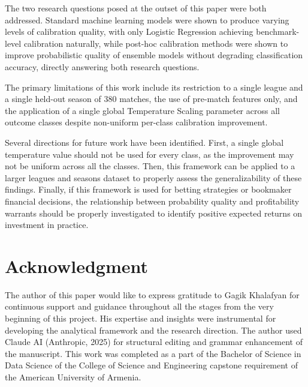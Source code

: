 \documentclass[conference]{IEEEtran}
\begin{document}
The two research questions posed at the outset of this paper
were both addressed. Standard machine learning models were
shown to produce varying levels of calibration quality, with
only Logistic Regression achieving benchmark-level
calibration naturally, while post-hoc calibration methods
were shown to improve probabilistic quality of ensemble
models without degrading classification accuracy, directly
answering both research questions.

The primary limitations of this work include its restriction
to a single league and a single held-out season of 380
matches, the use of pre-match features only, and the
application of a single global Temperature Scaling parameter
across all outcome classes despite non-uniform per-class
calibration improvement.

Several directions for future work have been identified.
First, a single global temperature value should not be used
for every class, as the improvement may not be uniform
across all the classes. Then, this framework can be applied
to a larger leagues and seasons dataset to properly assess
the generalizability of these findings. Finally, if this
framework is used for betting strategies or bookmaker
financial decisions, the relationship between probability
quality and profitability warrants should be properly
investigated to identify positive expected returns on
investment in practice.

\section*{Acknowledgment}
The author of this paper would like to express gratitude to Gagik Khalafyan for continuous support and guidance throughout all the stages from the very beginning of this project. His expertise and insights were instrumental for developing the analytical framework and the research direction.
The author used Claude AI (Anthropic, 2025) for structural editing and grammar enhancement of the manuscript.
This work was completed as a part of the Bachelor of Science in Data Science of the College of Science and Engineering capstone requirement of the American University of Armenia.
\end{document}
